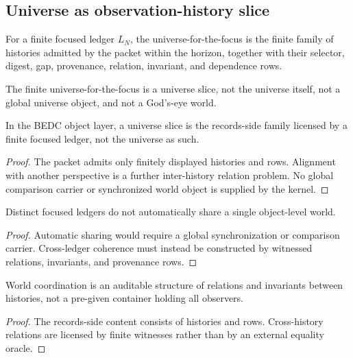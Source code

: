 \subsection{Universe as observation-history slice}
\label{subsec:philosophy-universe-observation-history-slice}

\begin{definition}
\label{def:philosophy-finite-universe-focus}
For a finite focused ledger \(L_N\), the universe-for-the-focus is the
finite family of histories admitted by the packet within the horizon,
together with their selector, digest, gap, provenance, relation,
invariant, and dependence rows.
\end{definition}

\begin{definition}
\label{def:philosophy-universe-slice}
The finite universe-for-the-focus is a universe slice, not the universe
itself, not a global universe object, and not a God's-eye world.
\end{definition}

\begin{theorem}
\label{thm:philosophy-universe-not-global-object}
In the BEDC object layer, a universe slice is the records-side family
licensed by a finite focused ledger, not the universe as such.
\end{theorem}
\begin{proof}
The packet admits only finitely displayed histories and rows. Alignment
with another perspective is a further inter-history relation problem.
No global comparison carrier or synchronized world object is supplied
by the kernel.
\end{proof}

\begin{corollary}
\label{cor:philosophy-focused-ledgers-no-shared-world-object}
Distinct focused ledgers do not automatically share a single
object-level world.
\end{corollary}
\begin{proof}
Automatic sharing would require a global synchronization or comparison
carrier. Cross-ledger coherence must instead be constructed by
witnessed relations, invariants, and provenance rows.
\end{proof}

\begin{corollary}
\label{cor:philosophy-world-coordination-relation}
World coordination is an auditable structure of relations and
invariants between histories, not a pre-given container holding all
observers.
\end{corollary}
\begin{proof}
The records-side content consists of histories and rows. Cross-history
relations are licensed by finite witnesses rather than by an external
equality oracle.
\end{proof}

